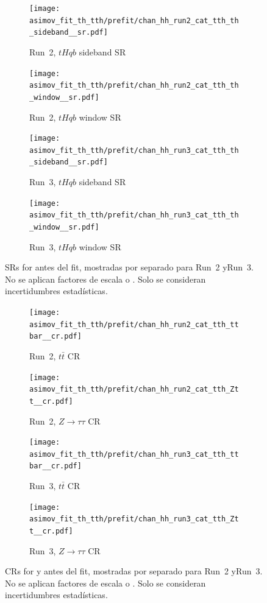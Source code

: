 \begin{figure}[htbp]
  \centering
  \begin{subfigure}[t]{0.45\textwidth}
    \centering
    \texttt{[image: asimov\_fit\_th\_tth/prefit/chan\_hh\_run2\_cat\_tth\_th\_sideband\_\_sr.pdf]}
    \caption{Run~2, $tHqb$ sideband SR}
  \end{subfigure}
  \hfill
  \begin{subfigure}[t]{0.45\textwidth}
    \centering
    \texttt{[image: asimov\_fit\_th\_tth/prefit/chan\_hh\_run2\_cat\_tth\_th\_window\_\_sr.pdf]}
    \caption{Run~2, $tHqb$ window SR}
  \end{subfigure}

  \vspace{0.4cm}
  \begin{subfigure}[t]{0.45\textwidth}
    \centering
    \texttt{[image: asimov\_fit\_th\_tth/prefit/chan\_hh\_run3\_cat\_tth\_th\_sideband\_\_sr.pdf]}
    \caption{Run~3, $tHqb$ sideband SR}
  \end{subfigure}
  \hfill
  \begin{subfigure}[t]{0.45\textwidth}
    \centering
    \texttt{[image: asimov\_fit\_th\_tth/prefit/chan\_hh\_run3\_cat\_tth\_th\_window\_\_sr.pdf]}
    \caption{Run~3, $tHqb$ window SR}
  \end{subfigure}

  \caption{SRs for \thqb antes del fit, mostradas por separado para Run~2 yRun~3. No se aplican factores de escala \ztautau o \ttbar. Solo se consideran incertidumbres estadísticas.}
  \label{res:fit_inputs_2}
\end{figure}

\begin{figure}[htbp]
  \centering
  \begin{subfigure}[t]{0.45\textwidth}
    \centering
    \texttt{[image: asimov\_fit\_th\_tth/prefit/chan\_hh\_run2\_cat\_tth\_ttbar\_\_cr.pdf]}
    \caption{Run~2, $t\bar{t}$ CR}
  \end{subfigure}
  \hfill
  \begin{subfigure}[t]{0.45\textwidth}
    \centering
    \texttt{[image: asimov\_fit\_th\_tth/prefit/chan\_hh\_run2\_cat\_tth\_Ztt\_\_cr.pdf]}
    \caption{Run~2, $Z\to\tau\tau$ CR}
  \end{subfigure}

  \vspace{0.4cm}
  \begin{subfigure}[t]{0.45\textwidth}
    \centering
    \texttt{[image: asimov\_fit\_th\_tth/prefit/chan\_hh\_run3\_cat\_tth\_ttbar\_\_cr.pdf]}
    \caption{Run~3, $t\bar{t}$ CR}
  \end{subfigure}
  \hfill
  \begin{subfigure}[t]{0.45\textwidth}
    \centering
    \texttt{[image: asimov\_fit\_th\_tth/prefit/chan\_hh\_run3\_cat\_tth\_Ztt\_\_cr.pdf]}
    \caption{Run~3, $Z\to\tau\tau$ CR}
  \end{subfigure}

  \caption{CRs for \ttbar y \ztautau antes del fit, mostradas por separado para Run~2 yRun~3. No se aplican factores de escala \ztautau o \ttbar. Solo se consideran incertidumbres estadísticas.}
  \label{res:fit_inputs_3}
\end{figure}


